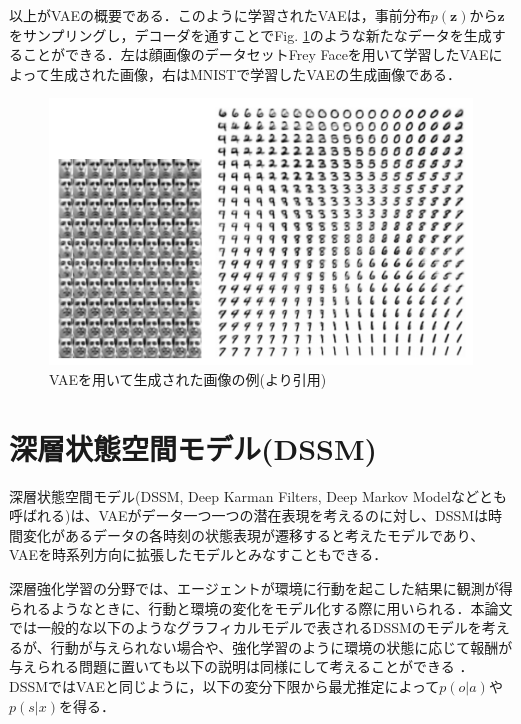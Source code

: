 以上がVAEの概要である．このように学習されたVAEは，事前分布$p(\bm{z})$から$\bm{z}$をサンプリングし，デコーダを通すことでFig. \ref{fig:vae_example}のような新たなデータを生成することができる．左は顔画像のデータセットFrey Faceを用いて学習したVAEによって生成された画像，右はMNISTで学習したVAEの生成画像である．


\begin{figure}[tbp]
  \begin{center}
    \includegraphics[width=\linewidth]{./figures/vae.png}
    \caption{VAEを用いて生成された画像の例(\cite{vae}より引用)}
    \label{fig:vae_example}
  \end{center}
\end{figure}

\section{深層状態空間モデル(DSSM)}
\label{section:dssm}

深層状態空間モデル(DSSM, Deep Karman Filters, Deep Markov Modelなどとも呼ばれる)は、VAEがデータ一つ一つの潜在表現を考えるのに対し、DSSMは時間変化があるデータの各時刻の状態表現が遷移すると考えたモデルであり、VAEを時系列方向に拡張したモデルとみなすこともできる．

深層強化学習の分野では、エージェントが環境に行動を起こした結果に観測が得られるようなときに、行動と環境の変化をモデル化する際に用いられる．本論文では一般的な以下のようなグラフィカルモデルで表されるDSSMのモデルを考えるが、行動が与えられない場合や、強化学習のように環境の状態に応じて報酬が与えられる問題に置いても以下の説明は同様にして考えることができる
．
DSSMではVAEと同じように，以下の変分下限から最尤推定によって$p(o|a)$や$p(s|x)$を得る．

